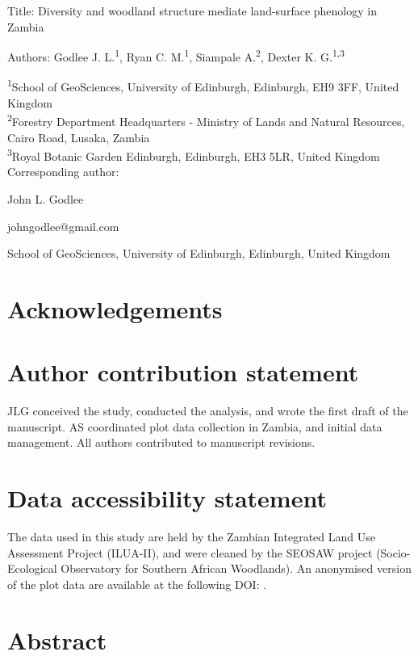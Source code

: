 \documentclass[11pt,a4paper]{article}
\begin{document}
{\Large{Title: Diversity and woodland structure mediate land-surface phenology in Zambia}}

Authors: Godlee J. L.\textsuperscript{1}, Ryan C. M.\textsuperscript{1}, Siampale A.\textsuperscript{2}, Dexter K. G.\textsuperscript{1,3}

\textsuperscript{1}School of GeoSciences, University of Edinburgh, Edinburgh, EH9 3FF, United Kingdom \\
\textsuperscript{2}Forestry Department Headquarters - Ministry of Lands and Natural Resources, Cairo Road, Lusaka, Zambia \\
\textsuperscript{3}Royal Botanic Garden Edinburgh, Edinburgh, EH3 5LR, United Kingdom \\

\vspace{1em}
Corresponding author:

John L. Godlee

johngodlee@gmail.com

School of GeoSciences, University of Edinburgh, Edinburgh, United Kingdom

\section*{Acknowledgements}

\section*{Author contribution statement}

JLG conceived the study, conducted the analysis, and wrote the first draft of the manuscript. AS coordinated plot data collection in Zambia, and initial data management. All authors contributed to manuscript revisions. 

\section*{Data accessibility statement}

The data used in this study are held by the Zambian Integrated Land Use Assessment Project (ILUA-II), and were cleaned by the SEOSAW project (Socio-Ecological Observatory for Southern African Woodlands). An anonymised version of the plot data are available at the following DOI: .

\newpage{}
\linenumbers

\section*{Abstract}
\end{document}
